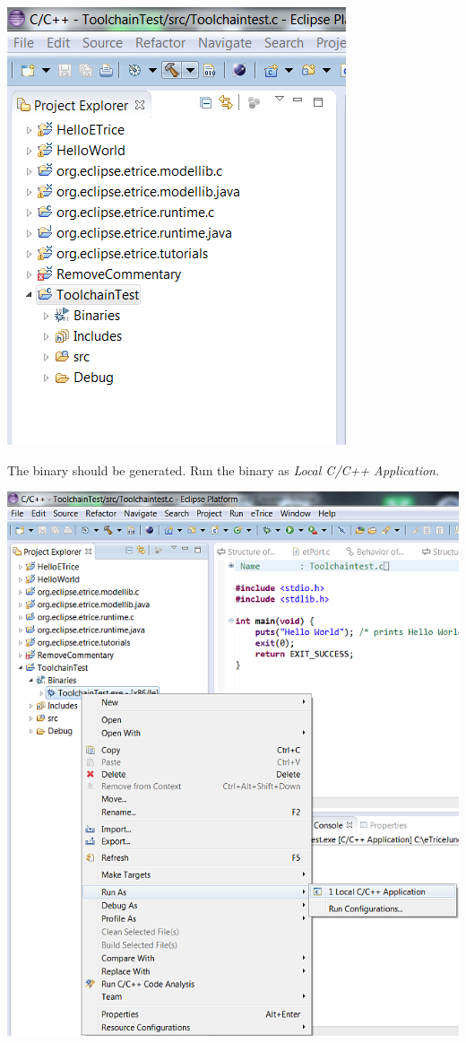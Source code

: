 \includegraphics{images/032-SetupWorkspaceC05.png}

The binary should be generated. Run the binary as \textit{Local C/C++ Application}.

\includegraphics{images/032-SetupWorkspaceC06.png}

